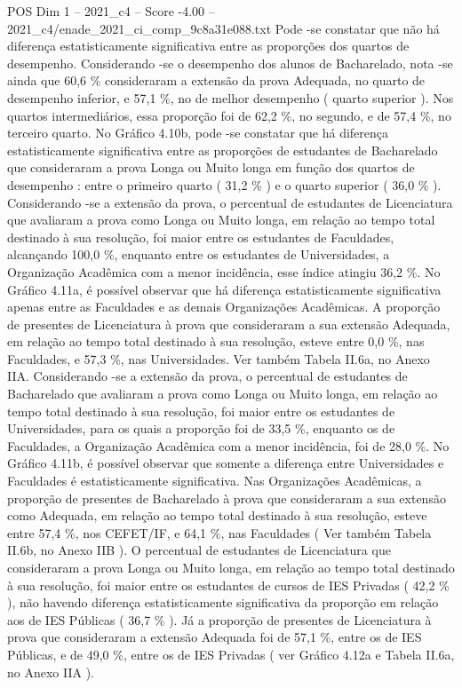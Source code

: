 \begin{textsample}{POS Dim 1 – 2021\_c4 – Score -4.00 – 2021\_c4/enade\_2021\_ci\_comp\_9c8a31e088.txt}
Pode -se constatar que não há diferença estatisticamente significativa entre as proporções dos quartos de desempenho.
Considerando -se o desempenho dos alunos de Bacharelado, nota -se ainda que 60,6 \% consideraram a extensão da prova Adequada, no quarto de desempenho inferior, e 57,1 \%, no de melhor desempenho ( quarto superior ).
Nos quartos intermediários, essa proporção foi de 62,2 \%, no segundo, e de 57,4 \%, no terceiro quarto.
No Gráfico 4.10b, pode -se constatar que há diferença estatisticamente significativa entre as proporções de estudantes de Bacharelado que consideraram a prova Longa ou Muito longa em função dos quartos de desempenho : entre o primeiro quarto ( 31,2 \% ) e o quarto superior ( 36,0 \% ).
Considerando -se a extensão da prova, o percentual de estudantes de Licenciatura que avaliaram a prova como Longa ou Muito longa, em relação ao tempo total destinado à sua resolução, foi maior entre os estudantes de Faculdades, alcançando 100,0 \%, enquanto entre os estudantes de Universidades, a Organização Acadêmica com a menor incidência, esse índice atingiu 36,2 \%.
No Gráfico 4.11a, é possível observar que há diferença estatisticamente significativa apenas entre as Faculdades e as demais Organizações Acadêmicas.
A proporção de presentes de Licenciatura à prova que consideraram a sua extensão Adequada, em relação ao tempo total destinado à sua resolução, esteve entre 0,0 \%, nas Faculdades, e 57,3 \%, nas Universidades.
Ver também Tabela II.6a, no Anexo IIA.
Considerando -se a extensão da prova, o percentual de estudantes de Bacharelado que avaliaram a prova como Longa ou Muito longa, em relação ao tempo total destinado à sua resolução, foi maior entre os estudantes de Universidades, para os quais a proporção foi de 33,5 \%, enquanto os de Faculdades, a Organização Acadêmica com a menor incidência, foi de 28,0 \%.
No Gráfico 4.11b, é possível observar que somente a diferença entre Universidades e Faculdades é estatisticamente significativa.
Nas Organizações Acadêmicas, a proporção de presentes de Bacharelado à prova que consideraram a sua extensão como Adequada, em relação ao tempo total destinado à sua resolução, esteve entre 57,4 \%, nos CEFET/IF, e 64,1 \%, nas Faculdades ( Ver também Tabela II.6b, no Anexo IIB ).
O percentual de estudantes de Licenciatura que consideraram a prova Longa ou Muito longa, em relação ao tempo total destinado à sua resolução, foi maior entre os estudantes de cursos de IES Privadas ( 42,2 \% ), não havendo diferença estatisticamente significativa da proporção em relação aos de IES Públicas ( 36,7 \% ).
Já a proporção de presentes de Licenciatura à prova que consideraram a extensão Adequada foi de 57,1 \%, entre os de IES Públicas, e de 49,0 \%, entre os de IES Privadas ( ver Gráfico 4.12a e Tabela II.6a, no Anexo IIA ).

\end{textsample}
